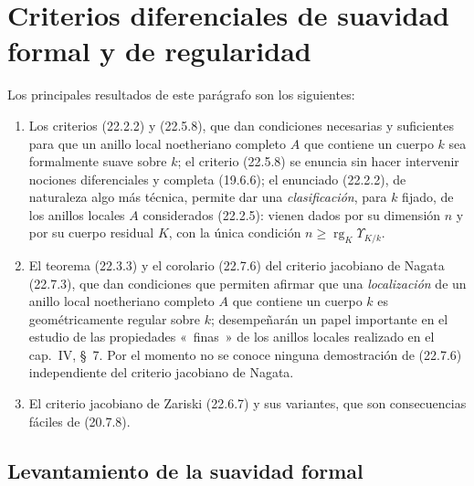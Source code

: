 \section{Criterios diferenciales de suavidad formal y de regularidad}
\label{section:0.22-fr}

Los principales resultados de este parágrafo son los siguientes:
\begin{enumerate}
  \item[\textit{a)}] Los criterios (22.2.2) y (22.5.8), que dan condiciones
  necesarias y suficientes para que un anillo local noetheriano completo $A$
  que contiene un cuerpo $k$ sea formalmente suave sobre $k$; el criterio
  (22.5.8) se enuncia sin hacer intervenir nociones diferenciales y completa
  (19.6.6); el enunciado (22.2.2), de naturaleza algo más técnica, permite dar
  una \emph{clasificación}, para $k$ fijado, de los anillos locales $A$
  considerados (22.2.5): vienen dados por su dimensión $n$ y por su cuerpo
  residual $K$, con la única condición
  $n\geqslant\operatorname{rg}_K\Upsilon_{K/k}$.

  \item[\textit{b)}] El teorema (22.3.3) y el corolario (22.7.6) del criterio
  jacobiano de Nagata (22.7.3), que dan condiciones que permiten afirmar que
  una \emph{localización} de un anillo local noetheriano completo $A$ que
  contiene un cuerpo $k$ es geométricamente regular sobre $k$; desempeñarán
  un papel importante en el estudio de las propiedades «~finas~» de los
  anillos locales realizado en el cap.~IV, §~7. Por el momento no se conoce
  ninguna demostración de (22.7.6) independiente del criterio jacobiano de
  Nagata.

  \item[\textit{c)}] El criterio jacobiano de Zariski (22.6.7) y sus variantes, que
  son consecuencias fáciles de (20.7.8).
\end{enumerate}


\subsection{Levantamiento de la suavidad formal}
\label{subsection:0.22.1-fr}

